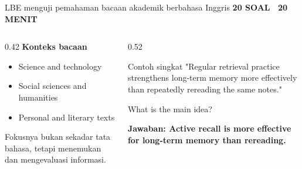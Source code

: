 \documentclass[aspectratio=169,11pt]{beamer}
\newcommand{\kicker}[1]{%
  {\color{StudentCyan}\bfseries\fontsize{10.5}{13}\selectfont\MakeUppercase{#1}}\par\vspace{0.11cm}
}
\newcommand{\answer}[1]{%
  \vspace{0.10cm}
  {\color{StudentGreen}\bfseries\fontsize{11.5}{14}\selectfont Jawaban: #1}
}
\begin{document}
\begin{frame}{LBE menguji pemahaman bacaan akademik berbahasa Inggris}
  \kicker{20 Soal \textbar\ 20 Menit}
  \begin{columns}[T,onlytextwidth]
    \begin{column}{0.42\textwidth}
      {\color{StudentBlue}\bfseries Konteks bacaan}\par
      \begin{itemize}
        \item Science and technology
        \item Social sciences and humanities
        \item Personal and literary texts
      \end{itemize}
      \vspace{0.10cm}
      {\color{StudentGray}\fontsize{10.5}{13}\selectfont Fokusnya bukan sekadar tata bahasa, tetapi menemukan dan mengevaluasi informasi.}
    \end{column}
    \begin{column}{0.52\textwidth}
      \begin{block}{Contoh singkat}
        "Regular retrieval practice strengthens long-term memory more effectively than repeatedly rereading the same notes."

        What is the main idea?

        \answer{Active recall is more effective for long-term memory than rereading.}
      \end{block}
    \end{column}
  \end{columns}
\end{frame}
\end{document}
